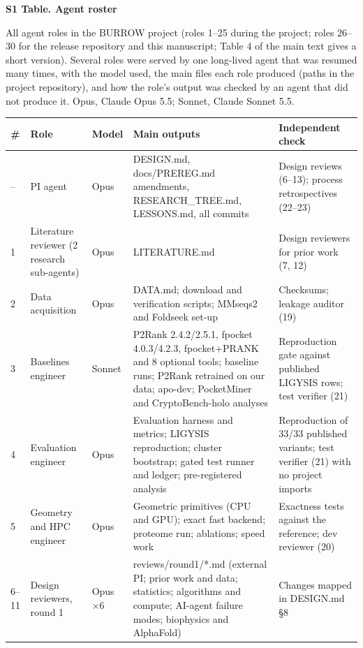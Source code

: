 \documentclass[10pt,letterpaper]{article}
\begin{document}
\begin{flushleft}
{\Large\textbf{S1 Table. Agent roster}}
\end{flushleft}
 All agent roles in the BURROW project (roles 1--25 during the project; roles 26--30 for the release repository and this manuscript; Table 4 of the main text gives a short version). Several roles were served by one long-lived agent that was resumed many times, with the model used, the main files each role produced (paths in the project repository), and how the role's output was checked by an agent that did not produce it. Opus, Claude Opus 5.5; Sonnet, Claude Sonnet 5.5.

{\footnotesize\begin{tabular}{p{0.6cm}p{3.0cm}p{1.3cm}p{5.0cm}p{4.0cm}}\hline
\textbf{\#} & \textbf{Role} & \textbf{Model} & \textbf{Main outputs} & \textbf{Independent check} \\ \hline
-- & PI agent & Opus & DESIGN.md, docs/PREREG.md amendments, RESEARCH\_TREE.md, LESSONS.md, all commits & Design reviews (6--13); process retrospectives (22--23) \\ \hline
1 & Literature reviewer (2 research sub-agents) & Opus & LITERATURE.md & Design reviewers for prior work (7, 12) \\ \hline
2 & Data acquisition & Opus & DATA.md; download and verification scripts; MMseqs2 and Foldseek set-up & Checksums; leakage auditor (19) \\ \hline
3 & Baselines engineer & Sonnet & P2Rank 2.4.2/2.5.1, fpocket 4.0.3/4.2.3, fpocket+PRANK and 8 optional tools; baseline runs; P2Rank retrained on our data; apo-dev; PocketMiner and CryptoBench-holo analyses & Reproduction gate against published LIGYSIS rows; test verifier (21) \\ \hline
4 & Evaluation engineer & Opus & Evaluation harness and metrics; LIGYSIS reproduction; cluster bootstrap; gated test runner and ledger; pre-registered analysis & Reproduction of 33/33 published variants; test verifier (21) with no project imports \\ \hline
5 & Geometry and HPC engineer & Opus & Geometric primitives (CPU and GPU); exact fast backend; proteome run; ablations; speed work & Exactness tests against the reference; dev reviewer (20) \\ \hline
6--11 & Design reviewers, round 1 & Opus $\times$6 & reviews/round1/*.md (external PI; prior work and data; statistics; algorithms and compute; AI-agent failure modes; biophysics and AlphaFold) & Changes mapped in DESIGN.md §8 \\ \hline

\end{tabular}}
\end{document}
